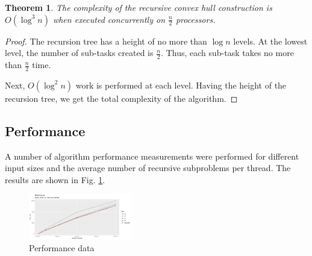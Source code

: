 \documentclass[twoside,twocolumn,10pt]{article}
\newtheorem{theorem}{Theorem}
\begin{document}
	\begin{theorem}
		The complexity of the recursive convex hull construction is $O(\log^3n)$ when executed concurrently on $\frac{n}{2}$ processors.
	\end{theorem}
	
	\begin{proof}
		The recursion tree has a height of no more than $\log n$ levels. At the lowest level, the number of sub-tasks created is $\frac{n}{2}$. Thus, each sub-task takes no more than $\frac{n}{2}$ time.
		
		Next, $O(\log^2 n)$ work is performed at each level. Having the height of the recursion tree, we get the total complexity of the algorithm.
	\end{proof}	
	

\subsection{Performance}


	A number of algorithm performance measurements were performed for different input sizes and the average number of recursive subproblems per thread. The results are shown in Fig. \ref{fig:performance}.
	
	\begin{figure}[h]
		\centering
		\includegraphics[width=0.4\textwidth, height=0.2\textheight]{performance}
		\caption{Performance data}
		\label{fig:performance}
	\end{figure}
\end{document}
